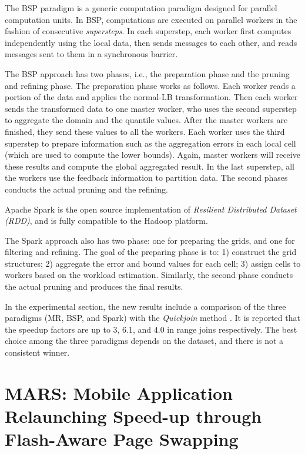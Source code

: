 \documentclass[paper=a4, fontsize=18pt]{article} %
\numberwithin{equation}{section} %
\numberwithin{figure}{section} %
\numberwithin{table}{section} %
\begin{document}
The BSP paradigm is a generic computation paradigm designed for parallel computation units. In BSP, computations are executed on parallel workers in the fashion of consecutive \emph{supersteps}. In each superstep, each worker first computes independently using the local data, then sends messages to each other, and reads messages sent to them in a synchronous barrier.

The BSP approach has two phases, i.e., the preparation phase and the  pruning and refining phase. The preparation phase works as follows. Each worker reads a portion of the data and applies the normal-LB transformation. Then each worker sends the transformed data to one master worker, who uses the second superstep to aggregate the domain and the quantile values. After the master workers are finished, they send these values to all the workers. Each worker uses the third superstep to prepare information such as the aggregation errors in each local cell (which are used to compute the lower bounds). Again, master workers will receive these results and compute the global aggregated result. In the last superstep, all the workers use the feedback information to partition data. The second phases conducts the actual pruning and the refining.

Apache Spark is the open source implementation of \emph{Resilient Distributed Dataset (RDD)}, and is fully compatible to the Hadoop platform.

The Spark approach also has two phase: one for preparing the grids, and one for filtering and refining. The goal of the preparing phase is to: 1) construct the grid structures; 2) aggregate the error and bound values for each cell; 3) assign cells to workers based on the workload estimation. Similarly, the second phase conducts the actual pruning and produces the final results.

In the experimental section, the new results include a comparison of the three paradigms (MR, BSP, and Spark) with the \emph{Quickjoin} method \cite{JS08}. It is reported that the speedup factors are up to 3, 6.1, and 4.0 in range joins respectively. The best choice among the three paradigms depends on the dataset, and there is not a consistent winner.

\section{MARS: Mobile Application Relaunching Speed-up through Flash-Aware Page Swapping \cite{GCFWZZ16}}
\end{document}
